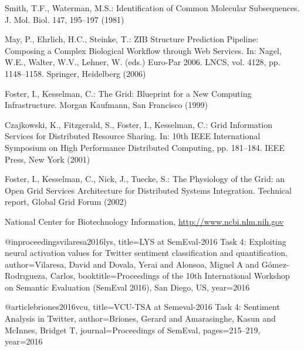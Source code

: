 \documentclass[runningheads,a4paper]{llncs}
\begin{document}
\begin{thebibliography}{4}

 Smith, T.F., Waterman, M.S.: Identification of Common Molecular
Subsequences. J. Mol. Biol. 147, 195--197 (1981)

 May, P., Ehrlich, H.C., Steinke, T.: ZIB Structure Prediction Pipeline:
Composing a Complex Biological Workflow through Web Services. In: Nagel,
W.E., Walter, W.V., Lehner, W. (eds.) Euro-Par 2006. LNCS, vol. 4128,
pp. 1148--1158. Springer, Heidelberg (2006)

 Foster, I., Kesselman, C.: The Grid: Blueprint for a New Computing
Infrastructure. Morgan Kaufmann, San Francisco (1999)

 Czajkowski, K., Fitzgerald, S., Foster, I., Kesselman, C.: Grid
Information Services for Distributed Resource Sharing. In: 10th IEEE
International Symposium on High Performance Distributed Computing, pp.
181--184. IEEE Press, New York (2001)

 Foster, I., Kesselman, C., Nick, J., Tuecke, S.: The Physiology of the
Grid: an Open Grid Services Architecture for Distributed Systems
Integration. Technical report, Global Grid Forum (2002)

 National Center for Biotechnology Information, \url{http://www.ncbi.nlm.nih.gov}

\end{thebibliography}

@inproceedings{vilaresa2016lys,
  title={LYS at SemEval-2016 Task 4: Exploiting neural activation values for Twitter sentiment classification and quantification},
  author={Vilaresa, David and Dovala, Yerai and Alonsoa, Miguel A and G{\'o}mez-Rodr{\i}gueza, Carlos},
  booktitle={Proceedings of the 10th International Workshop on Semantic Evaluation (SemEval 2016), San Diego, US},
  year={2016}
}

@article{briones2016vcu,
  title={VCU-TSA at Semeval-2016 Task 4: Sentiment Analysis in Twitter},
  author={Briones, Gerard and Amarasinghe, Kasun and McInnes, Bridget T},
  journal={Proceedings of SemEval},
  pages={215--219},
  year={2016}
}
\end{document}

